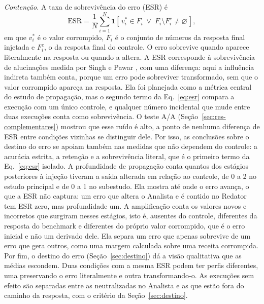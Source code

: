 \emph{Contenção.}
A taxa de sobrevivência do erro (ESR) é
\begin{equation}
\mathrm{ESR}=\frac{1}{N}\sum_{i=1}^{N}\mathbf{1}\!\left[\,v_i^{*}\in F_i \;\lor\; F_i\setminus F_i^{c}\neq\varnothing\,\right],
\label{eq:esr}
\end{equation}
em que $v_i^{*}$ é o valor corrompido, $F_i$ é o conjunto de números da resposta final injetada e $F_i^{c}$, o da resposta final do controle.
O erro sobrevive quando aparece literalmente na resposta ou quando a altera.
A ESR corresponde à sobrevivência de alucinações medida por Singh e Pawar \cite{singh2026snowball}, com uma diferença: aqui a influência indireta também conta, porque um erro pode sobreviver transformado, sem que o valor corrompido apareça na resposta.
Ela foi planejada como a métrica central do estudo de propagação, mas o segundo termo da Eq.~\ref{eq:esr} compara a execução com um único controle, e qualquer número incidental que mude entre duas execuções conta como sobrevivência.
O teste A/A (Seção~\ref{sec:res-complementares}) mostrou que esse ruído é alto, a ponto de nenhuma diferença de ESR entre condições vizinhas se distinguir dele.
Por isso, as conclusões sobre o destino do erro se apoiam também nas medidas que não dependem do controle: a acurácia estrita, a retenção e a sobrevivência literal, que é o primeiro termo da Eq.~\ref{eq:esr} isolado.
A profundidade de propagação conta quantos dos estágios posteriores à injeção tiveram a saída alterada em relação ao controle, de 0 a 2 no estudo principal e de 0 a 1 no subestudo. Ela mostra até onde o erro avança, o que a ESR não captura: um erro que altera o Analista e é contido no Redator tem ESR zero, mas profundidade um.
A amplificação conta os valores novos e incorretos que surgiram nesses estágios, isto é, ausentes do controle, diferentes da resposta do benchmark e diferentes do próprio valor corrompido, que é o erro inicial e não um derivado dele.
Ela separa um erro que apenas sobrevive de um erro que gera outros, como uma margem calculada sobre uma receita corrompida.
Por fim, o destino do erro (Seção~\ref{sec:destino}) dá a visão qualitativa que as médias escondem. Duas condições com a mesma ESR podem ter perfis diferentes, uma preservando o erro literalmente e outra transformando-o. As execuções sem efeito são separadas entre as neutralizadas no Analista e as que estão fora do caminho da resposta, com o critério da Seção~\ref{sec:destino}.

